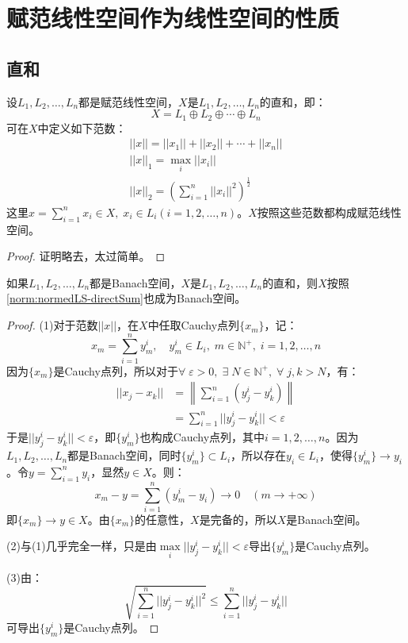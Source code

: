 \section{赋范线性空间作为线性空间的性质}

\subsection{直和}
\begin{theorem}
	设$L_1,L_2,\dots,L_n$都是赋范线性空间，$X$是$L_1,L_2,\dots,L_n$的直和，即：
	\begin{equation*}
		X=L_1\oplus L_2\oplus\cdots\oplus L_n
	\end{equation*}
	可在$X$中定义如下范数：
	\begin{gather*}\label{norm:normedLS-directSum}
		||x||=||x_1||+||x_2||+\cdots+||x_n|| \\
		||x||_1=\max_i||x_i|| \\
		||x||_2=\left(\sum_{i=1}^n||x_i||^2\right)^\frac{1}{2}
	\end{gather*}
	这里$x=\sum\limits_{i=1}^{n}x_i\in X,\;x_i\in L_i(i=1,2,\dots,n)$。$X$按照这些范数都构成赋范线性空间。
\end{theorem}
\begin{proof}
	证明略去，太过简单。
\end{proof}
\begin{theorem}
	如果$L_1,L_2,\dots,L_n$都是Banach空间，$X$是$L_1,L_2,\dots,L_n$的直和，则$X$按照\cref{norm:normedLS-directSum}也成为Banach空间。
\end{theorem}
\begin{proof}
	(1)对于范数$||x||$，在$X$中任取Cauchy点列$\{x_m\}$，记：
	\begin{equation*}
		x_m=\sum_{i=1}^{n}y_m^{i},\quad y_m^{i}\in L_i,\;m\in\mathbb{N}^+,\;i=1,2,\dots,n
	\end{equation*}
	因为$\{x_m\}$是Cauchy点列，所以对于$\forall\;\varepsilon>0,\;\exists\;N\in\mathbb{N}^+,\;\forall\;j,k>N$，有：
	\begin{align*}
		||x_j-x_k||
		&=\left\|\sum_{i=1}^{n}(y_j^i-y_k^i)\right\| \\
		&=\sum_{i=1}^{n}||y_j^i-y_k^i||<\varepsilon
	\end{align*}
	于是$||y_j^i-y_k^i||<\varepsilon$，即$\{y_m^i\}$也构成Cauchy点列，其中$i=1,2,\dots,n$。因为$L_1,L_2,\dots,L_n$都是Banach空间，同时$\{y_m^i\}\subset L_i$，所以存在$y_i\in L_i$，使得$\{y_m^i\}\to y_i$。令$y=\sum\limits_{i=1}^{n}y_i$，显然$y\in X$。则：
	\begin{equation*}
		x_m-y=\sum_{i=1}^{n}(y_m^i-y_i)\to 0\quad(m\to +\infty)
	\end{equation*}
	即$\{x_m\}\to y\in X$。由$\{x_m\}$的任意性，$X$是完备的，所以$X$是Banach空间。\par
	(2)与(1)几乎完全一样，只是由$\max\limits_i||y_j^i-y_k^i||<\varepsilon$导出$\{y_m^i\}$是Cauchy点列。\par
	(3)由：
	\begin{equation*}
		\sqrt{\sum_{i=1}^{n}||y_j^i-y_k^i||^2}\leqslant\sum_{i=1}^{n}||y_j^i-y_k^i||
	\end{equation*}
	可导出$\{y_m^i\}$是Cauchy点列。
\end{proof}

